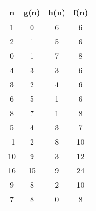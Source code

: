 \documentclass[11pt]{article}
\begin{document}
\begin{center}
  \begin{tabular}{| c | c | c | c |}
  \hline
  \textbf{n} & \textbf{g(n)} & \textbf{h(n)} & \textbf{f(n)} \\ \hline
  1 & 0 & 6 & 6 \\ \hline
  2 & 1 & 5 & 6 \\ \hline
  0 & 1 & 7 & 8 \\ \hline
  4 & 3 & 3 & 6 \\ \hline
  3 & 2 & 4 & 6 \\ \hline
  6 & 5 & 1 & 6 \\ \hline
  8 & 7 & 1 & 8 \\ \hline
  5 & 4 & 3 & 7 \\ \hline
  -1 & 2 & 8 & 10 \\ \hline
  10 & 9 & 3 & 12 \\ \hline
  16 & 15 & 9 & 24 \\ \hline
  9 & 8 & 2 & 10 \\ \hline
  7 & 8 & 0 & 8 \\ \hline
  \end{tabular}
  \end{center}
\end{document}
